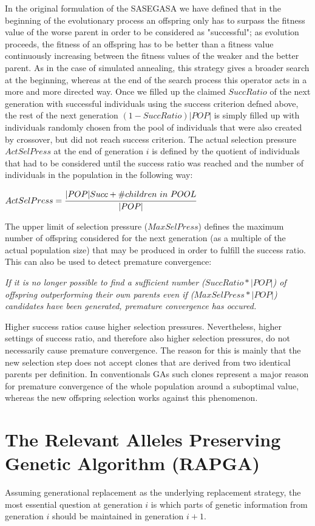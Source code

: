 \documentclass[12pt]{book}
\begin{document}
In the original formulation of the SASEGASA we have defined that in the beginning of the evolutionary process an offspring only has to surpass the fitness value of the worse parent in order to be considered as "successful"; as evolution proceeds, the fitness of an offspring has to be better than a fitness value continuously increasing between the fitness values of the weaker and the better parent. As in the case of simulated annealing, this strategy gives a broader search at the beginning, whereas at the end of the search process this operator acts in a more and more directed way. Once we filled up the claimed $SuccRatio$ of the next generation with successful individuals using the success criterion defned above, the rest of the next generation $(1-SuccRatio)|POP|$ is simply filled up with individuals randomly chosen from the pool of individuals that were also created by crossover, but did not reach success criterion. The actual selection pressure $ActSelPress$ at the end of generation $i$ is defined by the quotient of individuals that had to be considered until the success ratio was reached and the number of individuals in the population in the following way:
\begin{center}
$ActSelPress = \cfrac{|POP|Succ+\#children\ in\ POOL}{|POP|}$
\end{center}
The upper limit of selection pressure ($MaxSelPress$) defines the maximum number of offspring considered for the next generation (as a multiple of the actual population size) that may be produced in order to fulfill the success ratio. This can also be used to detect premature convergence:


\textit{If it is no longer possible to find a sufficient number ($SuccRatio*|POP|$) of offspring outperforming their own parents even if ($MaxSelPress*|POP|$) candidates have been generated, premature convergence has occured.}

Higher success ratios cause higher selection pressures. Nevertheless, higher settings of success ratio, and therefore also higher selection pressures, do not necessarily cause premature convergence. The reason for this is mainly that the new selection step does not accept clones that are derived from two identical parents per definition. In conventionals GAs such clones represent a major reason for premature convergence of the whole population around a suboptimal value, whereas the new offspring selection works against this phenomenon.

\section{The Relevant Alleles Preserving Genetic Algorithm (RAPGA)}
Assuming generational replacement as the underlying replacement strategy, the most essential question at generation $i$ is which parts of genetic information from generation $i$ should be maintained in generation $i+1$.
\end{document}
